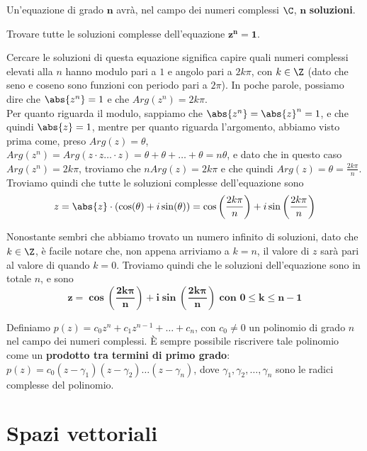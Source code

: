 \documentclass[11pt, a4paper, titlepage, oneside]{scrbook}
\begin{document}
\begin{Proposizione}
\label{propos-sol-comp}
Un'equazione di grado $\bm{n}$ avrà, nel campo dei numeri complessi $\C$, $\bm{n}$ \textbf{soluzioni}.
\end{Proposizione}

\Esempio

Trovare tutte le soluzioni complesse dell'equazione $\bm{z^n = 1}$. \nopagebreak

Cercare le soluzioni di questa equazione significa capire quali numeri complessi elevati alla $n$ hanno modulo pari a $1$ e angolo pari a $2k\pi$, con $k \in \Z$ (dato che seno e coseno sono funzioni con periodo pari a $2\pi$). In poche parole, possiamo dire che $\abs{z^n} = 1$ e che $Arg(z^n) = 2k\pi$.\\
Per quanto riguarda il modulo, sappiamo che $\abs{z^n} = \abs{z}^n = 1$, e che quindi $\abs{z} = 1$, mentre per quanto riguarda l'argomento, abbiamo visto prima come, preso $Arg(z) = \theta$, $Arg(z^n) = Arg(z \cdot z \ldots \cdot z) = \theta + \theta + \ldots + \theta = n \theta$, e dato che in questo caso $Arg(z^n) = 2k\pi$, troviamo che $nArg(z) = 2k\pi$ e che quindi $Arg(z) = \theta = \frac{2k\pi}{n}$. \\
Troviamo quindi che tutte le soluzioni complesse dell'equazione sono 
\[z = \abs{z} \cdot(\cos(\theta) + i \sin(\theta)) = \cos\left(\frac{2k\pi}{n}\right) + i \sin\left(\frac{2k\pi}{n}\right)\]

Nonostante sembri che abbiamo trovato un numero infinito di soluzioni, dato che $k \in \Z$, è facile notare che, non appena arriviamo a $k = n$, il valore di $z$ sarà pari al valore di quando $k = 0$. Troviamo quindi che le soluzioni dell'equazione sono in totale $n$, e sono  
\[\bm{z = \cos\left(\frac{2k\pi}{n}\right) + i \sin\left(\frac{2k\pi}{n}\right)} \textbf{ con } \bm{0 \leq k \leq n-1}\]

\begin{Proposizione}
\label{propos-teo-fon-alg}
Definiamo $p(z) = c_0 z^n + c_1 z^{n-1} + \ldots + c_n$, con $c_0 \neq 0$ un polinomio di grado $n$ nel campo dei numeri complessi. È sempre possibile riscrivere tale polinomio come un \textbf{prodotto tra termini di primo grado}: $p(z) = c_0(z-\gamma_1)(z-\gamma_2)\ldots(z-\gamma_n)$, dove $\gamma_1,\gamma_2,\ldots,\gamma_n$ sono le radici complesse del polinomio.
\end{Proposizione}

\chapter{Spazi vettoriali}
\end{document}
